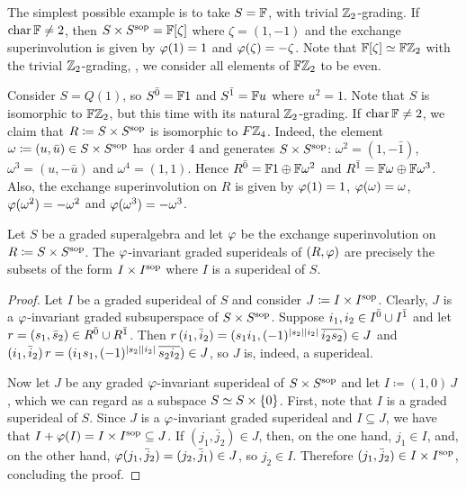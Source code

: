 \begin{ex}\label{ex:FxF-iso-FZ2}
	The simplest possible example is to take $S = \mathbb{F}$, with trivial $\mathbb{Z}_2$-grading.
	If $\operatorname{char} \mathbb{F} \neq 2$, then $S\times S^{\mathrm{sop}} = \mathbb{F} [\zeta]$ where $\zeta = (1, -1)$ and the exchange superinvolution is given by $\varphi(1) = 1$ and $\varphi(\zeta) = -\zeta$.
	Note that $\mathbb{F} [\zeta] \simeq \mathbb{F}\mathbb{Z}_2$ with the trivial $\mathbb{Z}_2$-grading, \ie, we consider all elements of $\mathbb{F}\mathbb{Z}_2$ to be even.
\end{ex}

\begin{ex}\label{ex:FZ2xFZ2sop-iso-FZ4}
	Consider $S = Q(1)$, so $S^{\bar0} = \mathbb{F} 1$ and $S^{\bar1} = \mathbb{F} u$ where $u^2 =1$.
	Note that $S$ is isomorphic to $\mathbb{F}\mathbb{Z}_2$, but this time with its natural $\mathbb{Z}_2$-grading.
	If $\operatorname{char} \mathbb{F} \neq 2$, we claim that $R \coloneqq S\times S^{\mathrm{sop}}$ is isomorphic to $F\mathbb{Z}_4$.
	Indeed, the element $\omega \coloneqq (u, \bar u) \in S\times S^{\mathrm{sop}}$ has order $4$ and generates $S\times S^{\mathrm{sop}}$: $\omega^2 = (1, - \bar 1)$, $\omega^3 = (u, - \bar u)$ and $\omega^4 = (1, 1)$.
	Hence $R^{\bar0} = \mathbb{F}1 \oplus \mathbb{F} \omega^2$ and $R^{\bar1} = \mathbb{F} \omega \oplus \mathbb{F} \omega^3$.
	Also, the exchange superinvolution on $R$ is given by $\varphi(1) = 1$, $\varphi(\omega) = \omega$, $\varphi(\omega^2) = -\omega^2$ and $\varphi(\omega^3) = -\omega^3$.
\end{ex}

\begin{lemma}\label{lemma:ideals-in-SxSsop}
	Let $S$ be a graded superalgebra and let $\varphi$ be the exchange superinvolution on $R \coloneqq S \times S^{\mathrm{sop}}$. 
	The $\varphi$-invariant graded superideals of $(R, \varphi)$ are precisely the subsets of the form $I \times I^{\mathrm{sop}}$ where $I$ is a superideal of $S$. 
\end{lemma}

\begin{proof}
	Let $I$ be a graded superideal of $S$ and consider $J \coloneqq I \times I^{\mathrm{sop}}$.
	Clearly, $J$ is a $\varphi$-invariant graded subsuperspace of $S \times S^{\mathrm{sop}}$.
	Suppose $i_1, i_2 \in I^{\bar0} \cup I^{\bar1}$ and let $r = (s_1, \bar s_2) \in R^{\bar0} \cup R^{\bar1}$.
	Then $r\, (i_1, \bar i_2) = (s_1 i_1, (-1)^{|s_2||i_2|}\, \overline{i_2 s_2}) \in J$ and $(i_1, \bar i_2)\, r = (i_1 s_1, (-1)^{|s_2||i_2|}\, \overline{s_2 i_2}) \in J$, so $J$ is, indeed, a superideal.

	Now let $J$ be any graded $\varphi$-invariant superideal of $S\times S^{\mathrm{sop}}$ and let $I \coloneqq (1,0)\, J$, which we can regard as a subspace $S \simeq S \times \{ 0 \}$.
	First, note that $I$ is a graded superideal of $S$. 
	Since $J$ is a $\varphi$-invariant graded superideal and $I \subseteq J$, we have that $I + \varphi(I) = I \times I^{\mathrm{sop}} \subseteq J$.
	If $(j_1, \bar j_2) \in J$, then, on the one hand, $j_1 \in I$, and, on the other hand, $\varphi(j_1, \bar j_2) = (j_2, \bar j_1) \in J$, so $j_2 \in I$.
	Therefore $(j_1, \bar j_2)\in I \times I^{\mathrm{sop}}$, concluding the proof.
\end{proof}

